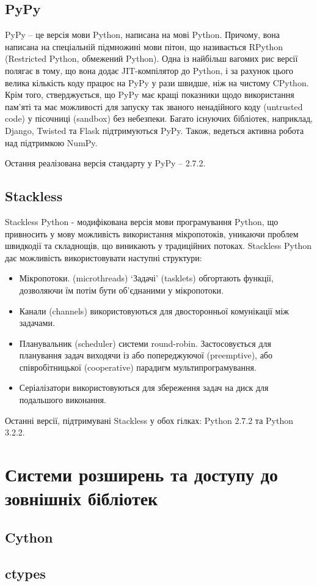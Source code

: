 \documentclass[a4paper, 12pt]{article}
\begin{document}
\subsection{PyPy}
PyPy -- це версія мови Python, написана на мові Python. Причому, вона написана на спеціальній 
підмножині мови пітон, що називається RPython (Restricted Python, обмежений Python). Одна 
із найбільш вагомих рис версії полягає в тому, що вона додає JIT-компілятор до Python, і за 
рахунок цього велика кількість коду працює на PyPy у рази швидше, ніж на чистому CPython. 
Крім того, стверджується, що PyPy має кращі показники щодо використання пам'яті та має 
можливості для запуску так званого ненадійного коду (untrusted code) у пісочниці (sandbox) 
без небезпеки. Багато існуючих бібліотек, наприклад, Django, Twisted та Flask підтримуються 
PyPy. Також, ведеться активна робота над підтримкою NumPy.

Остання реалізована версія стандарту у PyPy -- 2.7.2.

\subsection{Stackless}
Stackless Python - модифікована версія мови програмування Python, що привносить у мову
можливість використання мікропотоків, уникаючи проблем швидкодії та складнощів, що виникають
у традиційних потоках. Stackless Python дає можливість використовувати наступні структури:
\begin{itemize}
    \item Мікропотоки. (microthreads) `Задачі' (tasklets) обгортають функції, дозволяючи їм 
          потім бути об'єднаними у мікропотоки.
    \item Канали (channels) використовуються для двосторонньої комунікації між задачами.
    \item Планувальник (scheduler) системи round-robin. Застосовується для планування
          задач виходячи із або попереджуючої (preemptive), або співробітницької (cooperative) 
          парадигм мультипрограмування.
    \item Серіалізатори використовуються для збереження задач на диск для подальшого виконання.
\end{itemize}

Останні версії, підтримувані Stackless у обох гілках: Python 2.7.2 та Python 3.2.2.

\section{Системи розширень та доступу до зовнішніх бібліотек}

\subsection{Cython}

\subsection{ctypes}
\end{document}
